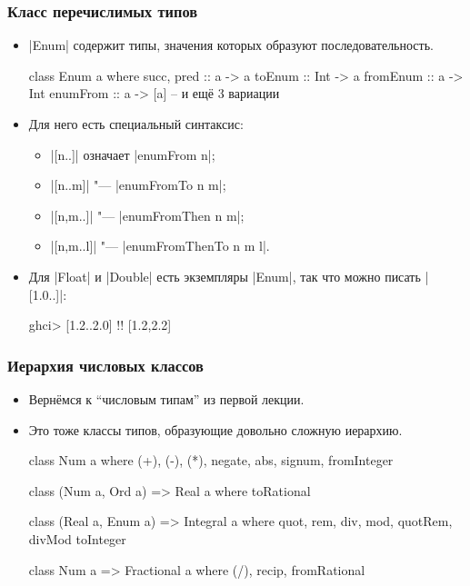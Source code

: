 \documentclass[10pt]{beamer}
\begin{document}
\begin{frame}[fragile]
  \frametitle{Класс перечислимых типов}
  \begin{itemize}
    \item
          \haskinline|Enum| содержит типы, значения которых образуют последовательность.
          \begin{haskell}
            class Enum a where
                succ, pred :: a -> a
                toEnum   :: Int -> a
                fromEnum :: a -> Int
                enumFrom :: a -> [a] -- и ещё 3 вариации
          \end{haskell}
          \pause
    \item Для него есть специальный синтаксис:
          \begin{itemize}
            \item \haskinline|[n..]| означает \haskinline|enumFrom n|;
            \item \haskinline|[n..m]| "--- \haskinline|enumFromTo n m|;
            \item \haskinline|[n,m..]| "--- \haskinline|enumFromThen n m|;
            \item \haskinline|[n,m..l]| "--- \haskinline|enumFromThenTo n m l|.
          \end{itemize}
          \pause
    \item Для \haskinline|Float| и \haskinline|Double| есть экземпляры \haskinline|Enum|, так что можно писать \haskinline|[1.0..]|:
          \begin{haskell}
            ghci> [1.2..2.0] !\pause!
            [1.2,2.2]
          \end{haskell}
  \end{itemize}
\end{frame}

\begin{frame}[fragile]
  \frametitle{Иерархия числовых классов}
  \begin{itemize}
    \item Вернёмся к \enquote{числовым типам} из первой лекции.
    \item Это тоже классы типов, образующие довольно сложную иерархию.\pause
          \begin{haskell}
            class Num a where
                (+), (-), (*), negate, abs, signum, fromInteger

            class (Num a, Ord a) => Real a where
                toRational
                
            class (Real a, Enum a) => Integral a where
                quot, rem, div, mod, quotRem, divMod
                toInteger
                
            class Num a => Fractional a where
                (/), recip, fromRational    
          \end{haskell}
  \end{itemize}
\end{frame}
\end{document}
